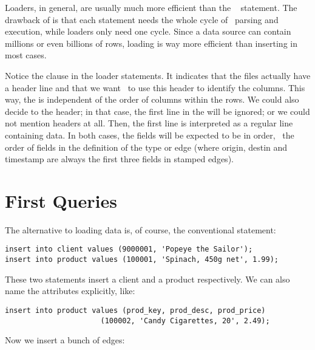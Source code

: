 Loaders, in general, are usually much more efficient than
the \sql\  statement.
The drawback of  is that each statement
needs the whole cycle of \sql\ parsing and execution,
while loaders only need one cycle. Since a data source
can contain millions or even billions of rows,
loading is way more efficient than inserting in most cases.

Notice the  clause in the loader statements.
It indicates that the  files actually
have a header line and that we want \nowdb\ to use this header
to identify the columns.
This way, the  is independent
of the order of columns within the rows.
We could also decide to  the header;
in that case, the first line
in the  will be ignored;
or we could not mention headers at all.
Then, the first line is interpreted as a regular
line containing data.
In both cases, the fields will be expected to be
in  order, \ie\ the order of fields in
the definition of the type or edge (where
origin, destin and timestamp are always
the first three fields in stamped edges).

\section{First Queries}
The alternative to loading data is, of course, the conventional
 statement:

\begin{sqlcode}
\begin{lstlisting}
insert into client values (9000001, 'Popeye the Sailor');
insert into product values (100001, 'Spinach, 450g net', 1.99);
\end{lstlisting}
\end{sqlcode}

These two statements insert a client and a product respectively.
We can also name the attributes explicitly, like:

\begin{sqlcode}
\begin{lstlisting}
insert into product values (prod_key, prod_desc, prod_price)
                      (100002, 'Candy Cigarettes, 20', 2.49);
\end{lstlisting}
\end{sqlcode}

Now we insert a bunch of edges:

